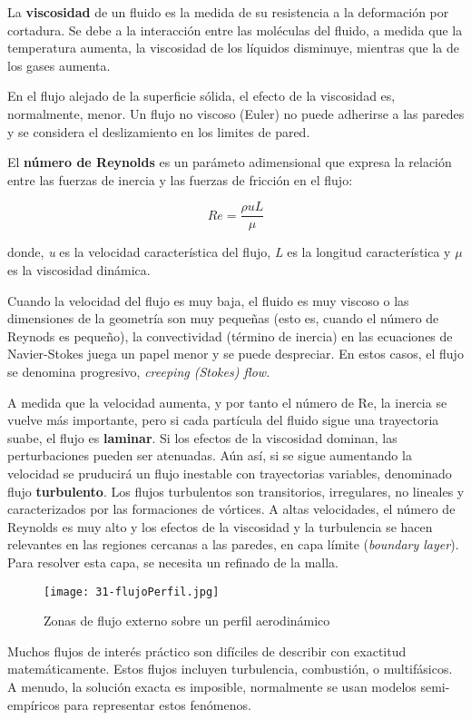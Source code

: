 La \textbf{viscosidad} de un fluido es la medida de su resistencia a la
deformación por cortadura. Se debe a la interacción entre las moléculas
del fluido, a medida que la temperatura aumenta, la viscosidad de los
líquidos disminuye, mientras que la de los gases aumenta.

En el flujo alejado de la superficie sólida, el efecto de la viscosidad
es, normalmente, menor. Un flujo no viscoso (Euler) no puede adherirse a
las paredes y se considera el deslizamiento en los limites de pared.

El \textbf{número de Reynolds} es un parámeto adimensional que expresa
la relación entre las fuerzas de inercia y las fuerzas de fricción en el
flujo:

\[Re= \frac{\rho u L}{\mu}\]

donde, \emph{u} es la velocidad característica del flujo, \emph{L} es la
longitud característica y \(\mu\) es la viscosidad dinámica.

Cuando la velocidad del flujo es muy baja, el fluido es muy viscoso o
las dimensiones de la geometría son muy pequeñas (esto es, cuando el
número de Reynods es pequeño), la convectividad (término de inercia) en
las ecuaciones de Navier-Stokes juega un papel menor y se puede
despreciar. En estos casos, el flujo se denomina progresivo,
\emph{creeping (Stokes) flow}.

A medida que la velocidad aumenta, y por tanto el número de Re, la
inercia se vuelve más importante, pero si cada partícula del fluido
sigue una trayectoria suabe, el flujo es \textbf{laminar}. Si los
efectos de la viscosidad dominan, las perturbaciones pueden ser
atenuadas. Aún así, si se sigue aumentando la velocidad se pruducirá un
flujo inestable con trayectorias variables, denominado flujo
\textbf{turbulento}. Los flujos turbulentos son transitorios,
irregulares, no lineales y caracterizados por las formaciones de
vórtices. A altas velocidades, el número de Reynolds es muy alto y los
efectos de la viscosidad y la turbulencia se hacen relevantes en las
regiones cercanas a las paredes, en capa límite (\emph{boundary layer}).
Para resolver esta capa, se necesita un refinado de la malla.

\begin{figure}
\centering
\texttt{[image: 31-flujoPerfil.jpg]}
\caption{Zonas de flujo externo sobre un perfil aerodinámico}
\label{fig:flujoPerfil}
\end{figure}

Muchos flujos de interés práctico son difíciles de describir con
exactitud matemáticamente. Estos flujos incluyen turbulencia,
combustión, o multifásicos. A menudo, la solución exacta es imposible,
normalmente se usan modelos semi-empíricos para representar estos
fenómenos.

